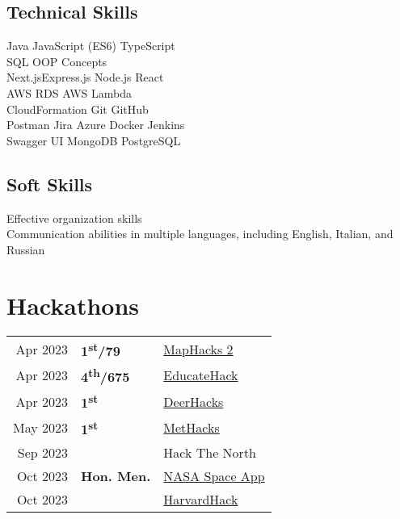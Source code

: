 \documentclass[]{DavidPietrocola-resume}
\begin{document}
\begin{minipage}[t]{0.37\textwidth}
\subsection{Technical Skills}
\smallsep
{}
\smallsep
Java \textbullet{}
JavaScript (ES6) \textbullet{} TypeScript\\   SQL \textbullet{} OOP Concepts
\mediumsep \\
\smallsep
Next.js\textbullet{}Express.js \textbullet{} Node.js \textbullet{} React
\mediumsep \\
\smallsep
AWS RDS \textbullet {} AWS Lambda \\CloudFormation \textbullet{}
Git \textbullet{} GitHub \\ Postman \textbullet{} Jira \textbullet {}Azure \textbullet{} Docker \textbullet{} Jenkins \\Swagger UI \textbullet{}MongoDB \textbullet{} PostgreSQL
\sectionsep
\subsection{Soft Skills}
\smallsep 
Effective organization skills\\Communication abilities in multiple languages, including English, Italian, and Russian
\sectionsep


\section{Hackathons}
\begin{tabular}{rll}
Apr 2023& \bf{1\textsuperscript{st}/79} & \href{https://devpost.com/software/tbd-p9xqhv}{MapHacks 2}\\
Apr 2023&\bf{4\textsuperscript{th}/675} & \href{https://devpost.com/software/hackthefeed-1ycujf}{EducateHack}\\
Apr 2023& \bf{1\textsuperscript{st}}& \href{https://devpost.com/software/tba-z5dkvc}{DeerHacks}\\
May 2023 & \bf{1\textsuperscript{st}}& \href{https://devpost.com/software/tba-asjk6y}{MetHacks}\\
Sep 2023 && Hack The North\\
Oct 2023  & \bf{Hon. Men.}& \href{https://www.spaceappschallenge.org/2023/find-a-team/intergalactic-pirates/}{NASA Space App}\\
Oct 2023 && \href{https://devpost.com/software/dataplace}{HarvardHack}\\
\end{tabular}
\sectionsep


\end{minipage}
\end{document}
